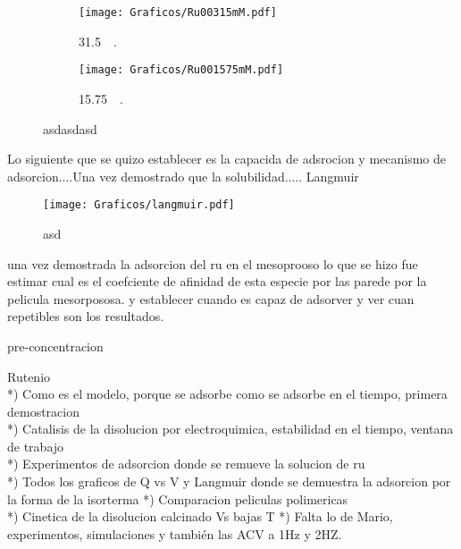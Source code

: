 \begin{figure}[th]
\begin{subfigure}[t]{0.325\textwidth}
		         	\label{fig:Ventana_Ru0063mM}
		     		\end{subfigure}
	     		\begin{subfigure}[t]{0.325\textwidth}
		        	\texttt{[image: Graficos/Ru00315mM.pdf]}
		       		\vspace*{-0.40cm}\caption{\aminorutenio\space \SI{31.5}{\micro\Molar}.}
		         	\label{fig:Ventana_Ru00315mM}
		     		\end{subfigure}
	     		\begin{subfigure}[t]{0.325\textwidth}
		        	\texttt{[image: Graficos/Ru001575mM.pdf]}
		       		\vspace*{-0.40cm}\caption{\aminorutenio\space \SI{15.75}{\micro\Molar}.}
		         	\label{fig:Ru_01575mM}
		     		\end{subfigure}	
	 	   	   	\caption[asdasdasd]{asdasdasd}
	     		\label{fig:ventana-trabajo}
	     	   	\end{figure} 	 	
	Lo siguiente que se quizo establecer es la capacida de adsrocion y mecanismo de adsorcion....Una vez demostrado que la solubilidad..... Langmuir	      	


		    \begin{figure}[ht]
				\centering
		 	    \texttt{[image: Graficos/langmuir.pdf]}
		        \caption[asd]{asd}
		        \label{fig:asd}
		      	\end{figure} 	

	

	una vez demostrada la adsorcion del ru en el mesoprooso lo que se hizo fue estimar cual es el coefciente de afinidad de esta especie por las parede por la pelicula mesorpososa. y establecer cuando es capaz de adsorver y ver cuan repetibles son los resultados.

		
		    
	pre-concentracion

	Rutenio\\
	*) Como es el modelo, porque se adsorbe como se adsorbe en el tiempo, primera demostracion\\
	*) Catalisis de la disolucion por electroquimica, estabilidad en el tiempo, ventana de trabajo\\
	*) Experimentos de adsorcion donde se remueve la solucion de ru\\
	*) Todos los graficos de Q vs V y Langmuir donde se demuestra la adsorcion por la forma de la isorterma 
	*) Comparacion peliculas polimericas\\
	*) Cinetica de la disolucion calcinado Vs bajas T	
	*) Falta lo de Mario, experimentos, simulaciones y también las ACV a 1Hz y 2HZ.


